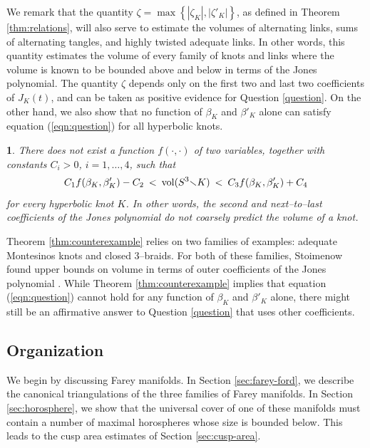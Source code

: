 \documentclass[11pt]{amsart}
\renewcommand{\setminus}{{\smallsetminus}}
\newcommand{\vol}{{\rm vol}}
\newcommand{\abs}[1]{{\left\vert #1 \right\vert}}
\theoremstyle{plain}
\newtheorem*{namedtheorem}{\theoremname}
\newcommand{\theoremname}{testing}
\newenvironment{named}[1]{\renewcommand{\theoremname}{#1}\begin{namedtheorem}}{\end{namedtheorem}}
\theoremstyle{definition}
\begin{document}
We remark that the quantity $\zeta = \max \left\{ \abs{\zeta_K}, \abs{\zeta'_K}  \right\} $, as defined in 
Theorem \ref{thm:relations}, will also serve to estimate the volumes of alternating links,
sums of alternating tangles, and highly twisted adequate links. In other words, this quantity
estimates the volume of every family of knots and links where the volume is known to be bounded
above and below in terms of the Jones polynomial. The quantity $\zeta$ depends only 
on the first two and last two coefficients of $J_K(t)$, and can be taken as positive evidence for
Question \ref{question}. On the other hand, we also  show that no function of $\beta_K$ and $\beta'_K$ alone can
satisfy equation (\ref{eqn:question}) for all hyperbolic knots.


\begin{named}{Theorem \ref{thm:counterexample}}
There does not exist a function $f(\cdot, \cdot)$ of two variables,
together with constants $C_i>0$, $i=1, \ldots, 4$, such that
$$C_1 f(\beta_K, \beta'_K) - C_2 \: < \: \vol(S^3\setminus K) \:<\:
C_3 f(\beta_K, \beta'_K) + C_4$$
%
for every hyperbolic knot $K$. In other words, the second and
next--to--last coefficients of the Jones polynomial do not coarsely
predict the volume of a knot.
\end{named}

Theorem \ref{thm:counterexample} relies on two families of examples:
adequate Montesinos knots and closed 3--braids.  For both of these families,
Stoimenow found upper bounds on volume in terms of outer coefficients of the 
Jones polynomial \cite{stoimenow:amphichiral}. While
Theorem \ref{thm:counterexample} implies that equation (\ref{eqn:question}) 
cannot hold for any function of $\beta_K$ and $\beta'_K$ alone, there might still be 
an affirmative answer to Question \ref{question} that uses other coefficients.
 


\subsection{Organization}

We begin by discussing Farey manifolds.  In Section
\ref{sec:farey-ford}, we describe the canonical triangulations of the
three families of Farey manifolds.  In Section \ref{sec:horosphere},
we show that the universal cover of one of these manifolds must
contain a number of maximal horospheres whose size is bounded below.
This leads to the cusp area estimates of Section \ref{sec:cusp-area}.
\end{document}
